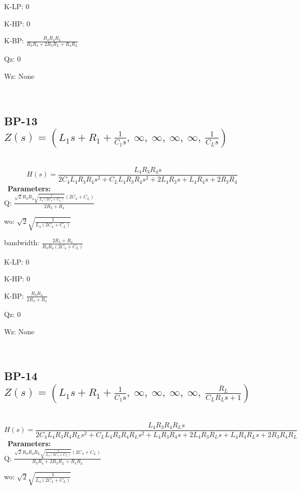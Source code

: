 \documentclass{article}
\begin{document}
K-LP: $0$\ 

K-HP: $0$\ 

K-BP: $\frac{R_{3} R_{4} R_{L}}{R_{3} R_{4} + 2 R_{3} R_{L} + R_{4} R_{L}}$\ 

Qz: $0$\ 

Wz: $\text{None}$\ 

\ 

\subsection{BP-13 $Z(s) = \left( L_{1} s + R_{1} + \frac{1}{C_{1} s}, \  \infty, \  \infty, \  \infty, \  \infty, \  \frac{1}{C_{L} s}\right)$ } \ 
\textbf{\[H(s) = \frac{L_{4} R_{3} R_{4} s}{2 C_{4} L_{4} R_{3} R_{4} s^{2} + C_{L} L_{4} R_{3} R_{4} s^{2} + 2 L_{4} R_{3} s + L_{4} R_{4} s + 2 R_{3} R_{4}}\] } \ 
\textbf{Parameters:}\\ 

Q: $\frac{\sqrt{2} R_{3} R_{4} \sqrt{\frac{1}{L_{4} \left(2 C_{4} + C_{L}\right)}} \left(2 C_{4} + C_{L}\right)}{2 R_{3} + R_{4}}$\ 

wo: $\sqrt{2} \sqrt{\frac{1}{L_{4} \left(2 C_{4} + C_{L}\right)}}$\ 

bandwidth: $\frac{2 R_{3} + R_{4}}{R_{3} R_{4} \left(2 C_{4} + C_{L}\right)}$\ 

K-LP: $0$\ 

K-HP: $0$\ 

K-BP: $\frac{R_{3} R_{4}}{2 R_{3} + R_{4}}$\ 

Qz: $0$\ 

Wz: $\text{None}$\ 

\ 

\subsection{BP-14 $Z(s) = \left( L_{1} s + R_{1} + \frac{1}{C_{1} s}, \  \infty, \  \infty, \  \infty, \  \infty, \  \frac{R_{L}}{C_{L} R_{L} s + 1}\right)$ } \ 
\textbf{\[H(s) = \frac{L_{4} R_{3} R_{4} R_{L} s}{2 C_{4} L_{4} R_{3} R_{4} R_{L} s^{2} + C_{L} L_{4} R_{3} R_{4} R_{L} s^{2} + L_{4} R_{3} R_{4} s + 2 L_{4} R_{3} R_{L} s + L_{4} R_{4} R_{L} s + 2 R_{3} R_{4} R_{L}}\] } \ 
\textbf{Parameters:}\\ 

Q: $\frac{\sqrt{2} R_{3} R_{4} R_{L} \sqrt{\frac{1}{L_{4} \left(2 C_{4} + C_{L}\right)}} \left(2 C_{4} + C_{L}\right)}{R_{3} R_{4} + 2 R_{3} R_{L} + R_{4} R_{L}}$\ 

wo: $\sqrt{2} \sqrt{\frac{1}{L_{4} \left(2 C_{4} + C_{L}\right)}}$\ 
\end{document}
